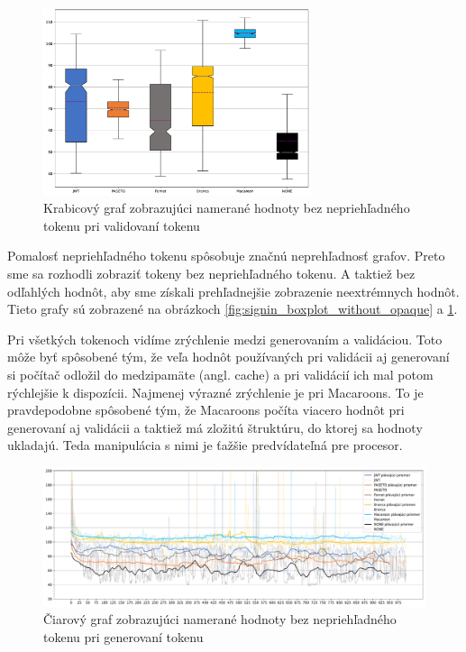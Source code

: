 \begin{figure}[H]
  \centerline{\includegraphics[width=0.7\textwidth]{images/request_boxplot_without_opaque}}
  \caption[Krabicový graf -- validácia, hodnoty bez nepriehľadného tokenu]{Krabicový graf zobrazujúci namerané hodnoty bez nepriehľadného tokenu pri validovaní tokenu}
  \label{fig:request_boxplot_without_opaque}
\end{figure}

Pomalosť nepriehľadného tokenu spôsobuje značnú neprehľadnosť grafov. Preto sme sa rozhodli zobraziť tokeny bez nepriehľadného tokenu. A taktiež bez odľahlých hodnôt, aby sme získali prehľadnejšie zobrazenie neextrémnych hodnôt. Tieto grafy sú zobrazené na obrázkoch \ref{fig:signin_boxplot_without_opaque} a \ref{fig:request_boxplot_without_opaque}.

Pri všetkých tokenoch vidíme zrýchlenie medzi generovaním a validáciou. Toto môže byť spôsobené tým, že veľa hodnôt používaných pri validácii aj generovaní si počítač odložil do medzipamäte (angl. cache) a pri validácií ich mal potom rýchlejšie k dispozícii. Najmenej výrazné zrýchlenie je pri Macaroons. To je pravdepodobne spôsobené tým, že Macaroons počíta viacero hodnôt pri generovaní aj validácii a taktiež má zložitú štruktúru, do ktorej sa hodnoty ukladajú. Teda manipulácia s nimi je ťažšie predvídateľná pre procesor.

\begin{figure}[H]
  \centerline{\includegraphics[width=1\textwidth]{images/signin_line_without_opaque}}
  \caption[Čiarový graf -- generovanie, hodnoty bez nepriehľadného tokenu]{Čiarový graf zobrazujúci namerané hodnoty bez nepriehľadného tokenu pri generovaní tokenu}
  \label{fig:signin_line_without_opaque}
\end{figure}

